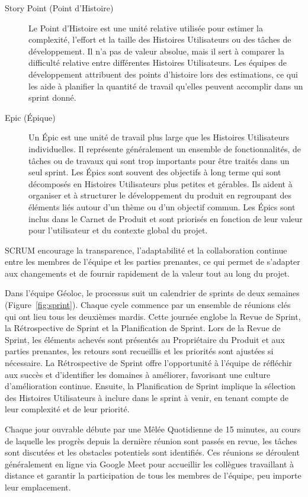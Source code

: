 \begin{description}
    \item[Story Point (Point d'Histoire)] Le Point d'Histoire est une unité relative utilisée pour estimer la complexité, l'effort et la taille des Histoires Utilisateurs ou des tâches de développement. Il n'a pas de valeur absolue, mais il sert à comparer la difficulté relative entre différentes Histoires Utilisateurs. Les équipes de développement attribuent des points d'histoire lors des estimations, ce qui les aide à planifier la quantité de travail qu'elles peuvent accomplir dans un sprint donné.
    \item[Epic (Épique)] Un Épic est une unité de travail plus large que les Histoires Utilisateurs individuelles. Il représente généralement un ensemble de fonctionnalités, de tâches ou de travaux qui sont trop importants pour être traités dans un seul sprint. Les Épics sont souvent des objectifs à long terme qui sont décomposés en Histoires Utilisateurs plus petites et gérables. Ils aident à organiser et à structurer le développement du produit en regroupant des éléments liés autour d'un thème ou d'un objectif commun. Les Épics sont inclus dans le Carnet de Produit et sont priorisés en fonction de leur valeur pour l'utilisateur et du contexte global du projet.
\end{description}

SCRUM encourage la transparence, l'adaptabilité et la collaboration continue entre les membres de l'équipe et les parties prenantes, ce qui permet de s'adapter aux changements et de fournir rapidement de la valeur tout au long du projet.

Dans l'équipe Géoloc, le processus suit un calendrier de sprints de deux semaines (Figure~\ref{fig:sprint}). Chaque cycle commence par un ensemble de réunions clés qui ont lieu tous les deuxièmes mardis. Cette journée englobe la Revue de Sprint, la Rétrospective de Sprint et la Planification de Sprint. Lors de la Revue de Sprint, les éléments achevés sont présentés au Propriétaire du Produit et aux parties prenantes, les retours sont recueillis et les priorités sont ajustées si nécessaire. La Rétrospective de Sprint offre l'opportunité à l'équipe de réfléchir aux succès et d'identifier les domaines à améliorer, favorisant une culture d'amélioration continue. Ensuite, la Planification de Sprint implique la sélection des Histoires Utilisateurs à inclure dans le sprint à venir, en tenant compte de leur complexité et de leur priorité.

Chaque jour ouvrable débute par une Mêlée Quotidienne de 15 minutes, au cours de laquelle les progrès depuis la dernière réunion sont passés en revue, les tâches sont discutées et les obstacles potentiels sont identifiés. Ces réunions se déroulent généralement en ligne via Google Meet pour accueillir les collègues travaillant à distance et garantir la participation de tous les membres de l'équipe, peu importe leur emplacement.

